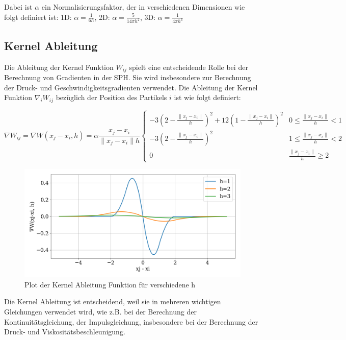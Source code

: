 \documentclass[a4paper, 12pt]{article}
\begin{document}
Dabei ist \(\alpha\) ein Normalisierungsfaktor, der in verschiedenen Dimensionen wie folgt definiert ist:
1D: \(\alpha = \frac{1}{6h}\), 2D: \(\alpha = \frac{5}{14\pi h^2}\), 3D: \(\alpha = \frac{1}{4\pi h^3}\)

\subsection{Kernel Ableitung}
Die Ableitung der Kernel Funktion $W_{ij}$ \cite{professor_presentation_2024} spielt eine entscheidende Rolle bei der Berechnung von Gradienten in der SPH. Sie wird insbesondere zur Berechnung der Druck- und Geschwindigkeitsgradienten verwendet. Die Ableitung der Kernel Funktion $\nabla_i W_{ij}$ bezüglich der Position des Partikels $i$ ist wie folgt definiert:

\begin{equation*}
	\nabla W_{ij} = \nabla W(x_j - x_i, h) = \alpha \frac{x_j - x_i}{\|x_j - x_i\|h} 
	\begin{cases} 
	-3(2-\frac{\|x_j - x_i\|}{h})^2 + 12(1-\frac{\|x_j - x_i\|}{h})^2 & 0 \leq \frac{\|x_j - x_i\|}{h} < 1 \\ 
	-3(2-\frac{\|x_j - x_i\|}{h})^2 & 1 \leq \frac{\|x_j - x_i\|}{h} < 2 \\ 
	0 & \frac{\|x_j - x_i\|}{h} \geq 2 
	\end{cases}
\end{equation*}	

\begin{figure}[H]
	\centering
	\includegraphics[width=\textwidth]{graphics/KernelDerivPlot.png}
	\caption{Plot der Kernel Ableitung Funktion für verschiedene h}
\end{figure}

Die Kernel Ableitung ist entscheidend, weil sie in mehreren wichtigen Gleichungen verwendet wird, wie z.B. bei der Berechnung der Kontinuitätsgleichung, der Impulsgleichung, insbesondere bei der Berechnung der Druck- und Viskositätsbeschleunigung.
\end{document}
